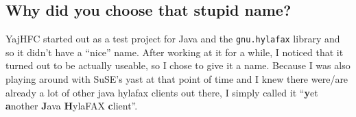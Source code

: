 \documentclass[a4paper,10pt]{scrartcl}
\begin{document}
\subsection{Why did you choose that stupid name?}

YajHFC started out as a test project for Java and the \texttt{gnu.hylafax} library and so
it didn't have a ``nice'' name. After working at it for a while, I noticed that it turned 
out to be actually useable, so I chose to give it a name.
Because I was also playing around with SuSE's yast at that point of time and I knew there
were/are already a lot of other java hylafax clients out there, I simply called it
``\textbf{y}et \textbf{a}nother \textbf{J}ava \textbf{H}ylaFAX \textbf{c}lient''. 
\end{document}
